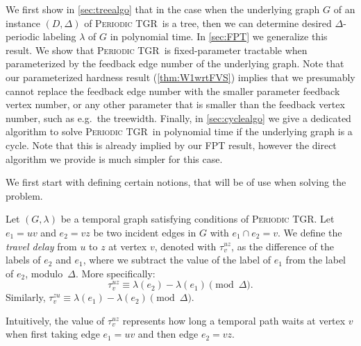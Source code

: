 \documentclass[a4paper,UKenglish,cleveref, autoref, thm-restate]{lipics-v2021}
\newcommand{\deltaExact}{\textsc{Periodic TGR}}
\begin{document}
We first show in \cref{sec:treealgo} that in the case when the underlying graph $G$ of an instance $(D, \Delta)$ of \deltaExact\ is a tree, then we can determine desired $\Delta$-periodic labeling $\lambda$ of $G$ in polynomial time. In \cref{sec:FPT} we generalize this result. We show that \deltaExact\ is fixed-parameter tractable when parameterized by the feedback edge number of the underlying graph. Note that our parameterized hardness result (\cref{thm:W1wrtFVS}) implies that we presumably cannot replace the feedback edge number with the smaller parameter feedback vertex number, or any other parameter that is smaller than the feedback vertex number, such as e.g.\ the treewidth.
Finally, in \cref{sec:cyclealgo} we give a dedicated algorithm to solve \deltaExact\ in polynomial time if the underlying graph is a cycle. Note that this is already implied by our FPT result, however the direct algorithm we provide is much simpler for this case.



We first start with defining certain notions, that will be of use when solving the problem.

    \begin{definition}
    Let $(G, \lambda)$ be a temporal graph satisfying conditions of \deltaExact.
    Let $e_1=uv$ and $e_2=vz$ be two incident edges in $G$ with $e_1 \cap e_2 = v$.
    We define the \emph{travel delay} from $u$ to $z$ at vertex $v$, denoted with $\tau_v^{uz}$,
    as the difference of the labels of $e_2$ and $e_1$, where we subtract the value of the label of $e_1$ from the label of $e_2$,  modulo~$\Delta$.
    More specifically:
    \begin{equation}\label{eq:def-VertexWaitingTime}
       \tau_v^{uz} \equiv \lambda (e_2) - \lambda(e_1) \pmod \Delta.
    \end{equation}
    Similarly, $\tau_v^{zu} \equiv \lambda (e_1) - \lambda(e_2) \pmod \Delta$.
    \end{definition}
    Intuitively, the value of $\tau_v^{uz}$ represents how long a temporal path waits at vertex $v$ when first taking edge $e_1=uv$ and then edge $e_2 = vz$.
\end{document}
